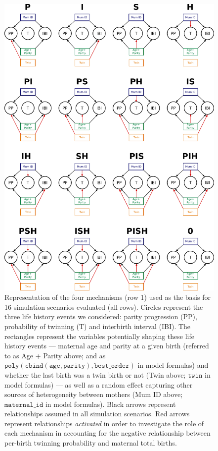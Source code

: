 \documentclass[a4paper]{article}\usepackage[]{graphicx}\usepackage[]{color}
\begin{document}
\begin{figure}[H]
\begin{center}
\includegraphics[width = 0.9\linewidth]{../figures/figS4.pdf}
\end{center}
\caption{Representation of the four mechanisms (row 1) used as the basis for 16 simulation scenarios evaluated (all rows). Circles represent the three life history events we considered: parity progression (PP), probability of twinning (T) and interbirth interval (IBI). The rectangles represent the variables potentially shaping these life history events — maternal age and parity at a given birth (referred to as Age + Parity above; and as $\mathtt{poly(cbind(age, parity), best\_order)}$ in model formulas) and whether the last birth was a twin birth or not (Twin above; $\mathtt{twin}$ in model formulas) — as well as a random effect capturing other sources of heterogeneity between mothers (Mum ID above; $\mathtt{maternal\_id}$ in model formulas). Black arrows represent relationships assumed in all simulation scenarios. Red arrows represent relationships \emph{activated} in order to investigate the role of each mechanism in accounting for the negative relationship between per-birth twinning probability and maternal total births.}
\end{figure}
\end{document}
